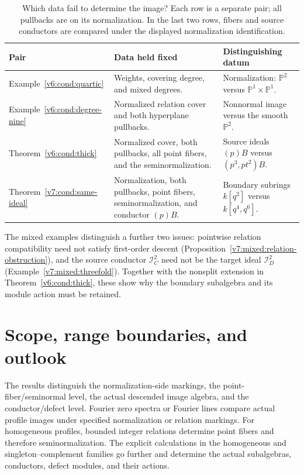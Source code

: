 \documentclass[10pt,fleqn]{article}
\numberwithin{equation}{section}
\newcommand{\PP}{\mathbb P}
\begin{document}
\begin{table}[H]
\centering\small
\caption{Which data fail to determine the image?  Each row is a separate pair;
all pullbacks are on its normalization.  In the last two rows, fibers and
source conductors are compared under the displayed normalization identification.}
\label{v7:table:separations}
\begin{tabular}{p{.15\linewidth}p{.39\linewidth}p{.38\linewidth}}
\toprule
Pair & Data held fixed & Distinguishing datum \\
\midrule
Example~\ref{v6:cond:quartic} & Weights, covering degree, and mixed degrees.
 & Normalization: $\PP^2$ versus $\PP^1\times\PP^1$.\\[3pt]
Example~\ref{v6:cond:degree-nine} & Normalized relation cover and both hyperplane pullbacks.
 & Nonnormal image versus the smooth $\PP^2$.\\[3pt]
Theorem~\ref{v6:cond:thick} & Normalized cover, both pullbacks, all point fibers, and the seminormalization.
 & Source ideals $(p)B$ versus $(p^3,pt^2)B$.\\[3pt]
Theorem~\ref{v7:cond:same-ideal} & Normalization, both pullbacks, point fibers, seminormalization, and conductor $(p)B$.
 & Boundary subrings $k[q^2]$ versus $k[q^4,q^6]$.\\
\bottomrule
\end{tabular}
\end{table}

The mixed examples distinguish a further two issues: pointwise relation
compatibility need not satisfy first-order descent
(Proposition~\ref{v7:mixed:relation-obstruction}), and the source conductor
$\mathcal I_C^2$ need not be the target ideal $\mathcal I_D^2$
(Example~\ref{v7:mixed:threefold}).  Together with the nonsplit extension
in Theorem~\ref{v6:cond:thick}, these show why the boundary subalgebra and
its module action must be retained.

\section{Scope, range boundaries, and outlook}\label{sec:outlook-b}
The results distinguish the normalization-side markings, the
point-fiber/seminormal level, the actual descended image algebra, and the
conductor/defect level.  Fourier zero spectra or Fourier lines compare actual
profile images under specified normalization or relation markings.  For
homogeneous profiles, bounded integer relations determine point fibers and
therefore seminormalization.  The explicit calculations in the homogeneous
and singleton--complement families go further and determine the actual
subalgebras, conductors, defect modules, and their actions.
\end{document}
